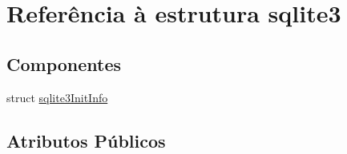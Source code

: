 \hypertarget{structsqlite3}{\section{Referência à estrutura sqlite3}
\label{structsqlite3}
}
\subsection*{Componentes}
\begin{DoxyCompactItemize}
\item 
struct \hyperlink{structsqlite3_1_1sqlite3_init_info}{sqlite3\-Init\-Info}
\end{DoxyCompactItemize}
\subsection*{Atributos Públicos}
